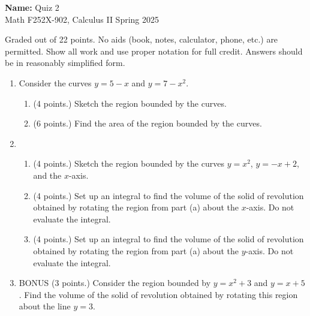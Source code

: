 \documentclass[12pt]{article}
\newcommand{\points}[1]{(#1 points.)}		%
\begin{document}
\pagestyle{plain}

\noindent \textbf{Name:} \underline{\hspace{15em}}		\hfill	Quiz 2 \\
           Math F252X-902, Calculus II  			\hfill	Spring 2025 	

                \vspace{1cm}
                
Graded out of 22 points. No aids (book, notes,
calculator, phone, etc.) are permitted. Show all work and use proper
notation for full credit. Answers should be in reasonably simplified
form.

\begin{enumerate}
    
\item Consider the curves $y=5-x$ and $y=7-x^2$.
  \begin{enumerate}
  \item \points{4} Sketch the region bounded by the curves.
    \vfill

  \item \points{6} Find the area of the region bounded by the curves.
    \vfill
    \vfill
  \end{enumerate}
  
  \newpage

\item
  \begin{enumerate}
  \item \points{4} Sketch the region bounded by the curves $y=x^2$,
    $y=-x+2$, and the $x$-axis.
    \vfill

  \item \points{4} Set up an integral to find the volume of the solid
    of revolution obtained by rotating the region from part (a) about the
    $x$-axis. Do not evaluate the integral.
    \vfill

  \item \points{4} Set up an integral to find the volume of the
    solid of revolution obtained by rotating the region from part (a)
    about the $y$-axis. Do not evaluate the integral.
    \vfill
  \end{enumerate}

  \newpage

\item BONUS \points{3} Consider the region bounded by $y=x^2+3$ and
  $y=x+5$. Find the volume of the solid of revolution obtained by
  rotating this region about the line $y=3$.
 
\end{enumerate}
\end{document}
